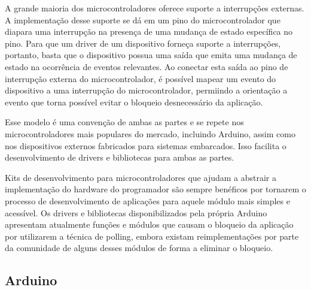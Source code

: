 \documentclass{article}
\begin{document}
\par A grande maioria dos microcontroladores oferece suporte a interrupções externas. A implementação desse suporte se dá em um pino do microcontrolador que diapara uma interrupção na presença de uma mudança de estado específica no pino. Para que um driver de um dispositivo forneça suporte a interrupções, portanto, basta que o dispositivo possua uma saída que emita uma mudança de estado na ocorrência de eventos relevantes. Ao conectar esta saída ao pino de interrupção externa do microcontrolador, é possível mapear um evento do dispositivo a uma interrupção do microcontrolador, permiindo a orientação a evento que torna possível evitar o bloqueio desnecessário da aplicação.
\par Esse modelo é uma convenção de ambas as partes e se repete nos microcontroladores mais populares do mercado, incluindo Arduino, assim como nos dispositivos externos fabricados para sistemas embarcados. Isso facilita o desenvolvimento de drivers e bibliotecas para ambas as partes.
\par Kits de desenvolvimento para microcontroladores que ajudam a abstrair a implementação do hardware do programador são sempre benéficos por tornarem o processo de desenvolvimento de aplicações para aquele módulo mais simples e acessível. Os drivers e bibliotecas disponibilizados pela própria Arduino apresentam atualmente funções e módulos que causam o bloqueio da aplicação por utilizarem a técnica de polling, embora existam reimplementações por parte da comunidade de alguns desses módulos de forma a eliminar o bloqueio.

\subsection{Arduino}
\end{document}
